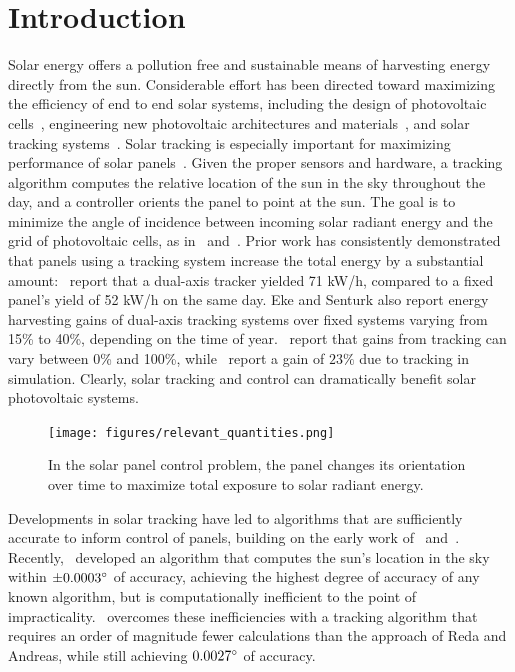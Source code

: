 \documentclass{article}
\begin{document}
\section{Introduction}
Solar energy offers a pollution free and sustainable means of harvesting energy directly from the sun. Considerable effort has been directed toward maximizing the efficiency of end to end solar systems, including the design of photovoltaic cells~\cite{Jervase2001,li2012molecular}, engineering new photovoltaic architectures and materials~\cite{li2005high}, and solar tracking systems~\cite{camacho2012control}. Solar tracking is especially important for maximizing performance of solar panels~\cite{Eke2012,Rizk2008,King2001}. Given the proper sensors and hardware, a tracking algorithm computes the relative location of the sun in the sky throughout the day, and a controller orients the panel to point at the sun. The goal is to minimize the angle of incidence between incoming solar radiant energy and the grid of photovoltaic cells, as in~\citet{Eke2012,Benghanem2011,King2001} and~\citet{kalogirou1996design}. Prior work has consistently demonstrated that panels using a tracking system increase the total energy by a substantial amount:~\citet{Eke2012} report that a dual-axis tracker yielded 71 kW/h, compared to a fixed panel's yield of 52 kW/h on the same day. Eke and Senturk also report energy harvesting gains of dual-axis tracking systems over fixed systems varying from 15\% to 40\%, depending on the time of year.~\citet{mousazadeh2009review} report that gains from tracking can vary between 0\% and 100\%, while~\citet{clifford2004design} report a gain of $23\%$ due to tracking in simulation. Clearly, solar tracking and control can dramatically benefit solar photovoltaic systems.

\begin{figure}[t]
\begin{center}
\texttt{[image: figures/relevant\_quantities.png]}
\caption{In the solar panel control problem, the panel changes its orientation over time to maximize total exposure to solar radiant energy.}
\label{fig:solar}
\end{center}
\end{figure}

Developments in solar tracking have led to algorithms that are sufficiently accurate to inform control of panels, building on the early work of~\citet{spencer1971fourier,walraven1978calculating} and~\citet{michalsky1988astronomical}. Recently,~\citet{reda2004solar} developed an algorithm that computes the sun's location in the sky within $\pm 0.0003\degree$ of accuracy, achieving the highest degree of accuracy of any known algorithm, but is computationally inefficient to the point of impracticality.~\citet{Grena2008} overcomes these inefficiencies with a tracking algorithm that requires an order of magnitude fewer calculations than the approach of Reda and Andreas, while still achieving $0.0027\degree$ of accuracy.
\end{document}

